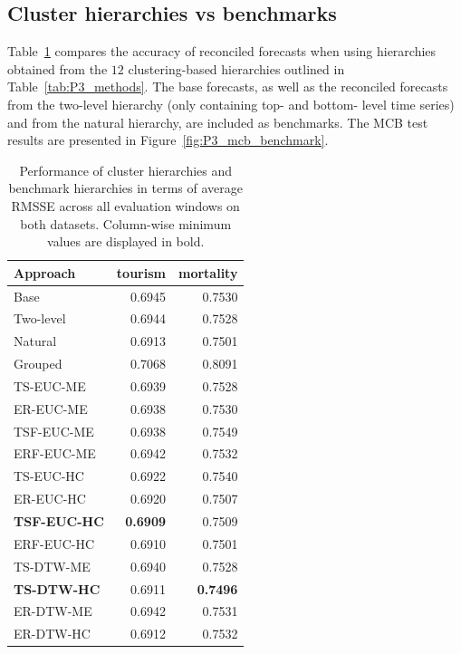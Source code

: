 \documentclass[a4paper,review,12pt,authoryear]{elsarticle}
\begin{document}
\subsection{Cluster hierarchies vs benchmarks}
\label{subsec:cluster_vs_benchmarks}


 
Table~\ref{tab:P3_rmsse} compares the accuracy of reconciled forecasts when using hierarchies obtained from the $12$ clustering-based hierarchies outlined in Table~\ref{tab:P3_methods}. The base forecasts, as well as the reconciled forecasts from the two-level hierarchy (only containing top- and bottom- level time series) and from the natural hierarchy, are included as benchmarks.
The MCB test results are presented in Figure~\ref{fig:P3_mcb_benchmark}.

\begin{table}[!h]
    \centering
\caption{\label{tab:P3_rmsse}Performance of cluster hierarchies and benchmark hierarchies in terms of average RMSSE across all evaluation windows on both datasets. Column-wise minimum values are displayed in bold.}
\begin{tabular}{lrr}\toprule
    Approach & tourism & mortality \\ \midrule
    Base & 0.6945 & 0.7530 \\ 
    Two-level & 0.6944 & 0.7528 \\ 
    Natural & 0.6913 & 0.7501 \\ 
    Grouped & 0.7068 & 0.8091\\
    TS-EUC-ME & 0.6939 & 0.7528 \\ 
    ER-EUC-ME & 0.6938 & 0.7530 \\ 
    TSF-EUC-ME & 0.6938 & 0.7549 \\ 
    ERF-EUC-ME & 0.6942 & 0.7532 \\ 
    TS-EUC-HC & 0.6922 & 0.7540 \\ 
    ER-EUC-HC & 0.6920 & 0.7507 \\ 
    \textbf{TSF-EUC-HC} & \textbf{0.6909} & 0.7509 \\ 
    ERF-EUC-HC & 0.6910 & 0.7501 \\ 
    TS-DTW-ME & 0.6940 & 0.7528 \\ 
    \textbf{TS-DTW-HC} & 0.6911 & \textbf{0.7496} \\ 
    ER-DTW-ME & 0.6942 & 0.7531 \\ 
    ER-DTW-HC & 0.6912 & 0.7532 \\ \bottomrule
\end{tabular}

\end{table}
\end{document}
